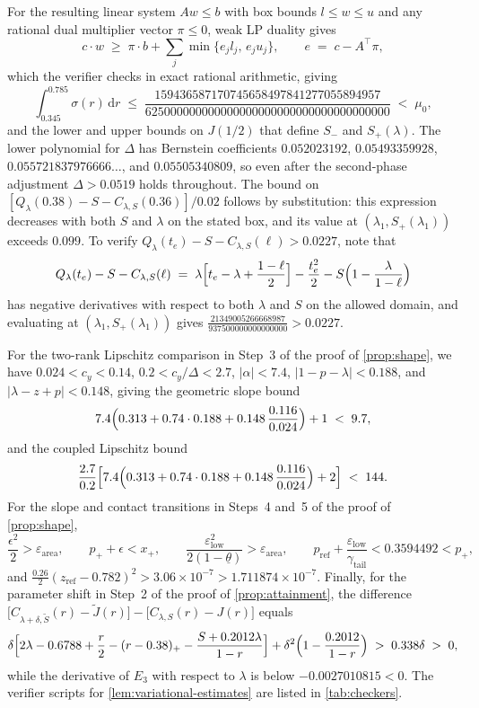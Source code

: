 \documentclass[11pt]{article}
\numberwithin{equation}{section}
\theoremstyle{plain}
\theoremstyle{definition}
\newcommand{\1}{\mathbf{1}}
\begin{document}
For the resulting linear system $A w \le b$ with box bounds $l \le w \le u$ and any rational dual multiplier vector $\pi \le 0$, weak LP duality gives
\[
  c \cdot w \;\ge\; \pi \cdot b + \sum_j \min\bigl\{e_j l_j,\, e_j u_j\bigr\},
  \qquad
  e \;=\; c - A^\top \pi,
\]
which the verifier checks in exact rational arithmetic, giving
\[
  \int_{0.345}^{0.785} \sigma(r)\,\mathrm{d}r \;\le\; \frac{159436587170745658497841277055894957}{625000000000000000000000000000000000000} \;<\; \mu_0,
\]
and the lower and upper bounds on $J(1/2)$ that define $S_-$ and $S_+(\lambda)$.
The lower polynomial for $\Delta$ has Bernstein coefficients $0.052023192$, $0.05493359928$, $0.055721837976666\dots$, and $0.05505340809$, so even after the second-phase adjustment $\Delta > 0.0519$ holds throughout. The bound on $[Q_\lambda(0.38)-S-C_{\lambda,S}(0.36)]/0.02$ follows by substitution: this expression decreases with both $S$ and $\lambda$ on the stated box, and its value at $(\lambda_1,S_+(\lambda_1))$ exceeds $0.099$. To verify $Q_\lambda(t_e) - S - C_{\lambda, S}(\ell) > 0.0227$, note that
\[
  Q_\lambda(t_e) - S - C_{\lambda, S}(\ell) \;=\; \lambda\Bigl[t_e - \lambda + \frac{1 - \ell}{2}\Bigr] - \frac{t_e^2}{2} - S\Bigl(1 - \frac{\lambda}{1 - \ell}\Bigr)
\]
has negative derivatives with respect to both $\lambda$ and $S$ on the allowed domain, and evaluating at $(\lambda_1, S_+(\lambda_1))$ gives $\frac{21349005266668987}{937500000000000000} > 0.0227$.

For the two-rank Lipschitz comparison in Step~3 of the proof of \cref{prop:shape}, we have $0.024 < c_y < 0.14$, $0.2 < c_y/\Delta < 2.7$, $|\alpha| < 7.4$, $|1 - p - \lambda| < 0.188$, and $|\lambda - z + p| < 0.148$, giving the geometric slope bound
\[
  7.4\Bigl(0.313 + 0.74 \cdot 0.188 + 0.148\,\frac{0.116}{0.024}\Bigr) + 1 \;<\; 9.7,
\]
and the coupled Lipschitz bound
\[
  \frac{2.7}{0.2}\Bigl[7.4\Bigl(0.313 + 0.74 \cdot 0.188 + 0.148\,\frac{0.116}{0.024}\Bigr) + 2\Bigr] \;<\; 144.
\]
For the slope and contact transitions in Steps~4 and~5 of the proof of \cref{prop:shape},
\[
  \frac{\epsilon^2}{2} > \varepsilon_{\mathrm{area}}, \qquad p_+ + \epsilon < x_+, \qquad \frac{\varepsilon_{\mathrm{low}}^2}{2(1 - \underline{\theta})} > \varepsilon_{\mathrm{area}}, \qquad p_{\mathrm{ref}} + \frac{\varepsilon_{\mathrm{low}}}{\gamma_{\mathrm{tail}}} < 0.3594492 < p_+,
\]
and $\frac{0.26}{2}(z_{\mathrm{ref}} - 0.782)^2 > 3.06 \times 10^{-7} > 1.711874 \times 10^{-7}$. Finally, for the parameter shift in Step~2 of the proof of \cref{prop:attainment}, the difference $\bigl[C_{\lambda+\delta, \widetilde{S}}(r) - \widetilde{J}(r)\bigr] - \bigl[C_{\lambda, S}(r) - J(r)\bigr]$ equals
\[
  \delta\Bigl[2\lambda - 0.6788 + \frac{r}{2} - (r - 0.38)_+ - \frac{S + 0.2012\lambda}{1 - r}\Bigr] + \delta^2\Bigl(1 - \frac{0.2012}{1 - r}\Bigr) \;>\; 0.338\delta \;>\; 0,
\]
while the derivative of $E_3$ with respect to $\lambda$ is below $-0.0027010815 < 0$. The verifier scripts for \cref{lem:variational-estimates} are listed in \cref{tab:checkers}.
\end{document}
